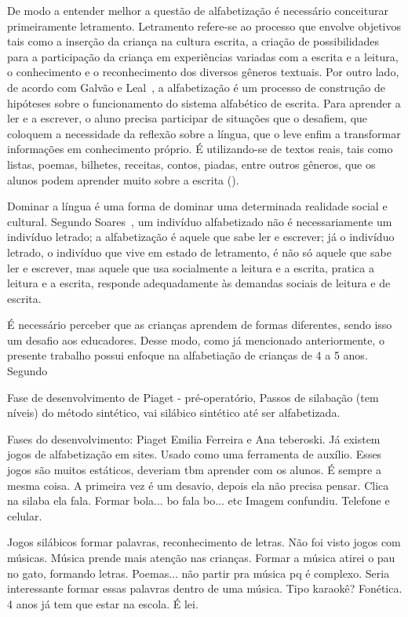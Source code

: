 \documentclass{sigchi}
\begin{document}
De modo a entender melhor a questão de alfabetização é necessário conceiturar primeiramente letramento. Letramento refere-se ao processo que envolve objetivos tais como a inserção da criança na cultura escrita, a criação de possibilidades para a participação da criança em experiências variadas com a escrita e a leitura, o conhecimento e o reconhecimento dos diversos gêneros textuais. Por outro lado, de acordo com Galvão e Leal~\cite{galvao2005ha}, a alfabetização é um processo de construção de hipóteses sobre o funcionamento do sistema alfabético de escrita. Para aprender a ler e a escrever, o aluno precisa participar de situações que o desafiem, que coloquem a necessidade da reflexão sobre a língua, que o leve enfim a transformar informações em conhecimento próprio. É utilizando-se de textos reais, tais como listas, poemas, bilhetes, receitas, contos, piadas, entre outros gêneros, que os alunos podem aprender muito sobre a escrita (\cite{galvao2005ha}).

Dominar a língua é uma forma de dominar uma determinada realidade social e cultural. Segundo Soares~\cite{soares2002letramento}, um indivíduo alfabetizado não é necessariamente um indivíduo letrado; a alfabetização é aquele que sabe ler e escrever; já o indivíduo letrado, o indivíduo que vive em estado de letramento, é não só aquele que sabe ler e escrever, mas aquele que usa socialmente a leitura e a escrita, pratica a leitura e a escrita, responde adequadamente às demandas sociais de leitura e de escrita.

É necessário perceber que as crianças aprendem de formas diferentes, sendo isso um desafio aos educadores. Desse modo, como já mencionado anteriormente, o presente trabalho possui enfoque na alfabetiação de crianças de 4 a 5 anos. Segundo 




Fase de desenvolvimento de Piaget - pré-operatório, Passos de silabação (tem níveis) do método sintético, vai silábico sintético até ser alfabetizada.

Fases do desenvolvimento: Piaget
Emilia Ferreira e Ana teberoski.
Já existem jogos de alfabetização em sites. Usado como uma ferramenta de auxílio. Esses jogos são muitos estáticos, deveriam tbm aprender com os alunos.
É sempre a mesma coisa. A primeira vez é um desavio, depois ela não precisa pensar.
Clica na silaba ela fala. Formar bola... bo fala bo... etc
Imagem confundiu. Telefone e celular.

Jogos silábicos formar palavras, reconhecimento de letras. Não foi visto jogos com músicas. 
Música prende mais atenção nas crianças.
Formar a música atirei o pau no gato, formando letras. Poemas... não partir pra música pq é complexo.
Seria interessante formar essas palavras dentro de uma música. Tipo karaokê?
Fonética.
4 anos já tem que estar na escola. É lei.
\end{document}
